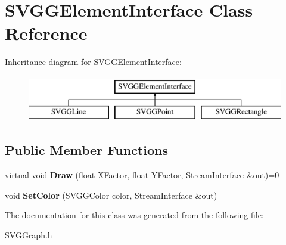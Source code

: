 \hypertarget{classSVGGElementInterface}{
\section{SVGGElementInterface Class Reference}
\label{classSVGGElementInterface}
}
Inheritance diagram for SVGGElementInterface:\begin{figure}[H]
\begin{center}
\leavevmode
\includegraphics[height=2.000000cm]{classSVGGElementInterface}
\end{center}
\end{figure}
\subsection*{Public Member Functions}
\begin{DoxyCompactItemize}
\item 
\hypertarget{classSVGGElementInterface_ab1b44820b07e53aef0a06886c45031ec}{
virtual void {\bfseries Draw} (float XFactor, float YFactor, StreamInterface \&out)=0}
\label{classSVGGElementInterface_ab1b44820b07e53aef0a06886c45031ec}

\item 
\hypertarget{classSVGGElementInterface_ac6b542f4b5349350b4da6ff88c8e399a}{
void {\bfseries SetColor} (SVGGColor color, StreamInterface \&out)}
\label{classSVGGElementInterface_ac6b542f4b5349350b4da6ff88c8e399a}

\end{DoxyCompactItemize}


The documentation for this class was generated from the following file:\begin{DoxyCompactItemize}
\item 
SVGGraph.h\end{DoxyCompactItemize}

